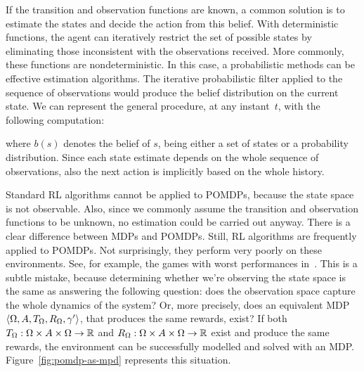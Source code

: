 If the transition and observation functions are known, a common solution is to
estimate the states and decide the action from this belief. With deterministic
functions, the agent can iteratively restrict the set of possible states by
eliminating those inconsistent with the observations received. More commonly,
these functions are nondeterministic. In this case, a probabilistic methods
can be effective estimation algorithms. The iterative probabilistic filter
applied to the sequence of observations would produce the belief distribution
on the current state.
We can represent the general procedure, at any instant~$t$, with the
following computation:
\begin{center}
\end{center}
where $b(s)$ denotes the belief of $s$, being either a set of states or a
probability distribution. Since each state estimate depends on the whole
sequence of observations, also the next action is implicitly based on the
whole history.

Standard RL algorithms cannot be applied to POMDPs, because the state space is
not observable. Also, since we commonly assume the transition and observation
functions to be unknown, no estimation could be carried out anyway.  There is
a clear difference between MDPs and POMDPs. Still, RL algorithms are
frequently applied to POMDPs. Not surprisingly, they perform very poorly on
these environments. See, for example, the games with worst performances
in~\cite{bib:atari-deepq-nature}. This is a subtle mistake, because
determining whether we're observing the state space is the same as answering
the following question: does the observation space capture the whole dynamics
of the system? Or, more precisely, does an equivalent MDP $\langle \Omega, A,
T_\Omega, R_\Omega, \gamma' \rangle$, that produces the same rewards, exist?
If both $T_\Omega: \Omega \times A \times \Omega \to \mathbb{R}$ and $R_\Omega: \Omega
\times A \times \Omega \to \mathbb{R}$ exist and produce the same rewards, the
environment can be successfully modelled and solved with an MDP.
Figure~\ref{fig:pomdp-as-mpd} represents this situation.

